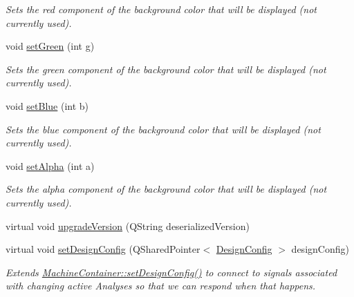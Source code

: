 \begin{DoxyCompactItemize}
\begin{DoxyCompactList}\small\item\em Sets the red component of the background color that will be displayed (not currently used). \end{DoxyCompactList}\item 
\hypertarget{class_picto_1_1_state_a64980e13db6c7e9bb8f94215d4a1cd89}{void \hyperlink{class_picto_1_1_state_a64980e13db6c7e9bb8f94215d4a1cd89}{set\-Green} (int g)}\label{class_picto_1_1_state_a64980e13db6c7e9bb8f94215d4a1cd89}

\begin{DoxyCompactList}\small\item\em Sets the green component of the background color that will be displayed (not currently used). \end{DoxyCompactList}\item 
\hypertarget{class_picto_1_1_state_a4e54680e9723085e812fc9e77a905b06}{void \hyperlink{class_picto_1_1_state_a4e54680e9723085e812fc9e77a905b06}{set\-Blue} (int b)}\label{class_picto_1_1_state_a4e54680e9723085e812fc9e77a905b06}

\begin{DoxyCompactList}\small\item\em Sets the blue component of the background color that will be displayed (not currently used). \end{DoxyCompactList}\item 
\hypertarget{class_picto_1_1_state_a6166c9a92171e2b1739d5fdc2427b858}{void \hyperlink{class_picto_1_1_state_a6166c9a92171e2b1739d5fdc2427b858}{set\-Alpha} (int a)}\label{class_picto_1_1_state_a6166c9a92171e2b1739d5fdc2427b858}

\begin{DoxyCompactList}\small\item\em Sets the alpha component of the background color that will be displayed (not currently used). \end{DoxyCompactList}\item 
virtual void \hyperlink{class_picto_1_1_state_a465f0b44d0bc636a48efdefb2e5ee82f}{upgrade\-Version} (Q\-String deserialized\-Version)
\item 
\hypertarget{class_picto_1_1_state_a7b662aa2303578c599af93e656b4c42a}{virtual void \hyperlink{class_picto_1_1_state_a7b662aa2303578c599af93e656b4c42a}{set\-Design\-Config} (Q\-Shared\-Pointer$<$ \hyperlink{class_picto_1_1_design_config}{Design\-Config} $>$ design\-Config)}\label{class_picto_1_1_state_a7b662aa2303578c599af93e656b4c42a}

\begin{DoxyCompactList}\small\item\em Extends \hyperlink{class_picto_1_1_asset_ae5606ab47c82a89034689a9423fb4daa}{Machine\-Container\-::set\-Design\-Config()} to connect to signals associated with changing active Analyses so that we can respond when that happens. \end{DoxyCompactList}\end{DoxyCompactItemize}

